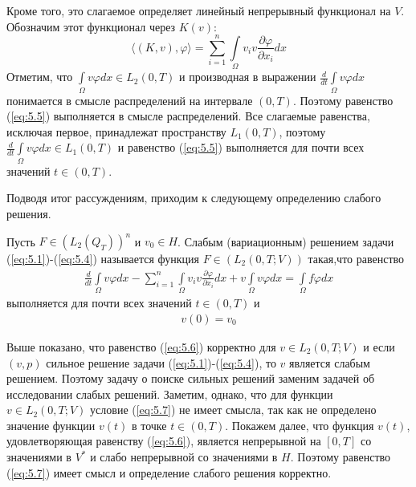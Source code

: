 Кроме того, это слагаемое определяет линейный непрерывный функционал на $V$. Обозначим этот функционал через $K(v)$:
$$ \langle (K,v),\varphi \rangle =\sum_{i=1}^{n}\int\limits_\Omega v_i v \frac{\partial \varphi}{\partial x_i}dx$$
Отметим, что $\int\limits_\Omega v \varphi dx\in L_2(0,T)$ и производная в выражении \linebreak
$\frac{d}{dt}\int\limits_\Omega v \varphi dx$
понимается в смысле распределений на интервале $(0,T)$. Поэтому равенство (\ref{eq:5.5}) выполняется в смысле распределений.
Все слагаемые равенства, исключая первое, принадлежат пространству $L_1(0,T)$, поэтому $\frac{d}{dt}\int\limits_\Omega v \varphi dx\in L_1(0,T)$
и равенство (\ref{eq:5.5}) выполняется для почти всех значений $t\in (0,T)$.

Подводя итог рассуждениям, приходим к следующему определению слабого решения.
\begin{definition}
    Пусть $F\in (L_2(Q_T))^n$ и $v_0\in H$. Слабым (вариационным) решением задачи (\ref{eq:5.1})-(\ref{eq:5.4}) называется функция $F\in (L_2(0,T;V))$ такая,что равенство
    \begin{equation}\label{eq:5.6}
        \begin{gathered}
            \frac{d}{dt}\int\limits_\Omega v \varphi dx-\sum_{i=1}^{n}\int\limits_\Omega v_i v
            \frac{\partial \varphi }{\partial x_i}dx + v\int\limits_\Omega v \varphi dx=
            \int\limits_\Omega f \varphi dx
        \end{gathered}
    \end{equation}
    выполняется для почти всех значений $t \in (0, T)$ и
    \begin{equation}\label{eq:5.7}
        \begin{gathered}
            v(0) = v_0
        \end{gathered}
    \end{equation}
\end{definition}

Выше показано, что равенство (\ref{eq:5.6}) корректно для $v \in L_2(0, T; V)$ и если $(v, p)$  сильное решение задачи (\ref{eq:5.1})-(\ref{eq:5.4}),
то $v$ является слабым решением. Поэтому задачу о поиске сильных решений заменим задачей об исследовании слабых решений.
Заметим, однако, что для функции $v \in L_2(0, T; V)$ условие (\ref{eq:5.7}) не имеет смысла, так как не определено значение функции $v(t)$ в точке
$t \in (0, T)$. Покажем далее, что функция $v(t)$, удовлетворяющая равенству (\ref{eq:5.6}), является непрерывной на $[0, T]$ со значениями в $V^\ast$ и слабо
непрерывной со значениями в $H$. Поэтому равенство (\ref{eq:5.7}) имеет смысл и определение слабого решения корректно.

